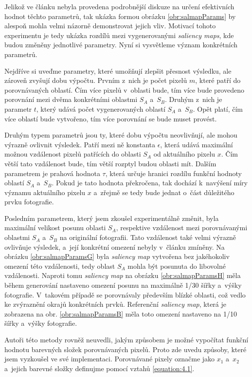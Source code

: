 Jelikož ve článku \cite{Stentiford2007} nebyla provedena podrobnější diskuze na určení efektivních hodnot těchto parametrů, tak ukázka formou obrázku \ref{obr:salmapParams} by alespoň mohla velmi názorně demonstrovat jejich vliv. Motivací tohoto experimentu je tedy ukázka rozdílů mezi vygenerovanými \emph{saliency maps}, kde budou změněny jednotlivé parametry. Nyní si vysvětleme význam konkrétních parametrů.

Nejdříve si uveďme parametry, které umožňují zlepšit přesnost výsledku, ale zároveň zvyšují dobu výpočtu. Prvním z~nich je počet pixelů $m$, které patří do porovnávaných oblastí. Čím více pixelů v~oblasti bude, tím více bude provedeno porovnání mezi dvěma konkrétními oblastmi $S_A$ a~$S_B$. Druhým z~nich je parametr $t$, který udává počet vygenerovaných oblastí $S_A$ a~$S_B$. Opět platí, čím více oblastí bude vytvořeno, tím více porovnání se bude muset provést.

Druhým typem parametrů jsou ty, které dobu výpočtu neovlivňují, ale mohou výrazně ovlivnit výsledek. Patří mezi ně konstanta $\epsilon$, která udává maximální možnou vzdálenost pixelů patřících do oblasti $S_A$ od aktuálního pixelu $x$. Čím větší tato vzdálenost bude, tím větší rozptyl budou oblasti mít. Dalším parametrem je prahová hodnota $\tau$, která určuje hranici rozdílu funkční hodnoty oblastí $S_A$ a~$S_B$. Pokud je tato hodnota překročena, tak dochází k~navýšení míry významu aktuálního pixelu $x$ a~zřejmě se tedy bude jednat o~část důležitého prvku fotografie.

Posledním parametrem, který jsem zkoušel experimentálně změnit, byla maximální velikost posunu oblasti $S_A$, respektive vzdálenost mezi porovnávanými oblastmi $S_A$ a~$S_B$ na originální fotografii. Tato vzdálenost také velmi výrazně ovlivňuje výsledek, a~její konkrétní omezení nebyly v~článku \cite{Stentiford2007} zmíněny. Na obrázku \ref{obr:salmapParamsG} byla \emph{saliency map} vytvořena bez jakéhokoliv omezení této vzdálenosti, tedy oblast $S_A$ mohla být posunuta do libovolné vzdálenosti. Naproti tomu \emph{saliency map} na obrázku \ref{obr:salmapParamsH} měla během generování nastaveno omezení posunu na maximálně 1/30 šířky a~výšky fotografie. V~takovém případě se porovnávaly především blízké oblasti, což vedlo ke zvýraznění okrajů konkrétních prvků. Referenční \emph{saliency map}, která je zobrazena na obr. \ref{obr:salmapParamsB} měla toto omezení nastaveno na 1/10 šířky a~výšky fotografie.

Autoři této metody rovněž neuvedli, jakým způsobem je možné vypočítat funkční hodnotu barevných složek porovnávaných pixelů. Proto zde uvedu způsoby, které jsem vyzkoušel ve své implementaci. Porovnávané pixely označme jako $x_1$ a~$x_2$ a~jejich barevné složky definujme pomocí vztahů \ref{equation:4.1}.

